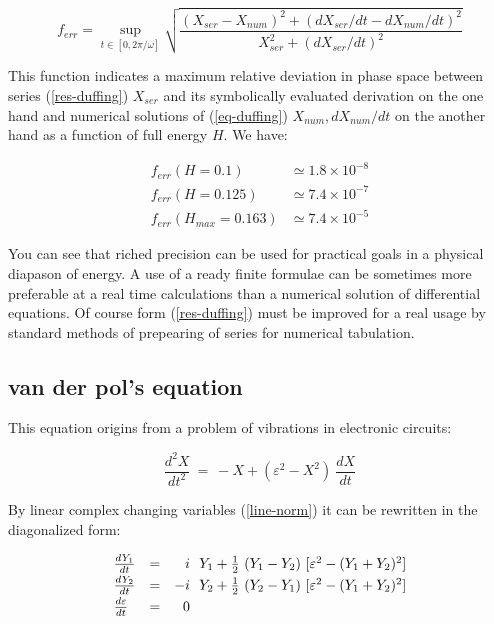 \begin{equation}
\label{f-err}
f_{err} =  \sup_{t \in [0,2\pi/\omega]} \sqrt{
\frac{(X_{ser}-X_{num})^2 + (dX_{ser}/dt-dX_{num}/dt)^2}
{X_{ser}^2+(dX_{ser}/dt)^2}}
\end{equation}

This function indicates a maximum relative deviation in phase space
between series (\ref{res-duffing}) $X_{ser}$ and its symbolically 
evaluated derivation on the one hand and numerical solutions of
(\ref{eq-duffing}) $X_{num}, dX_{num}/dt$ on the another hand 
as a function of 
full energy $H$. We have:

$$
\begin{array}{ll}
f_{err}(H=0.1) &\simeq 1.8 \times 10^{-8}\\
f_{err}(H=0.125) &\simeq 7.4 \times 10^{-7}\\
f_{err}(H_{max}=0.163) &\simeq 7.4 \times 10^{-5}
\end{array}
$$

You can see that riched precision can be used for practical goals in
a physical diapason of energy. A use of a ready finite formulae can
be sometimes more preferable at a real time calculations than a 
numerical solution of differential equations. Of course form
(\ref{res-duffing}) must be improved for a real usage by standard
methods of prepearing of series for numerical tabulation.


\subsection{van der pol's equation}

   This equation origins from a problem of vibrations in electronic
circuits:

\begin{equation}
\label{eq-vdp}
\frac{d^{2}X}{dt^2} \ = \ - X + (\varepsilon^2 - X^2) \ \frac{dX}{dt}
\end{equation}

By linear complex changing variables (\ref{line-norm})
it can be rewritten in the diagonalized form:

$$
\begin{array}{lcrl}
\frac{\mathstrut dY_1}{\mathstrut dt}& = &  i &\!\! Y_1 + 
   {1 \over 2} \ (Y_1-Y_2) \ [\varepsilon^2 - (Y_1 +Y_2)^2]\\
\frac{\mathstrut dY_2}{\mathstrut dt}& = & -i &\!\! Y_2 + 
   {1 \over 2} \ (Y_2-Y_1) \ [\varepsilon^2 - (Y_1 +Y_2)^2]\\
\frac{\mathstrut d\varepsilon}{\mathstrut dt}& = &0
\end{array}
$$

